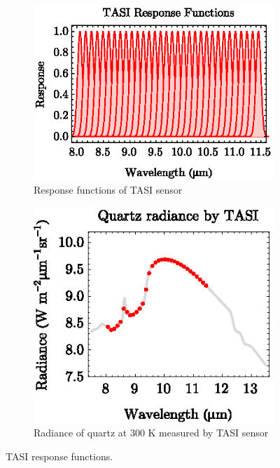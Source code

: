 \begin{figure}[thb]
	\centering
	\vspace{1em}
	\begin{subfigure}[t]{.5\linewidth}
		\centering
		\includegraphics[scale=1]{pics/Chapter_02/TASIResponseFunctions.eps}
		\caption{Response functions of TASI sensor}
		\label{fig:ResponseFunctions}
	\end{subfigure}
	\hspace{2em}
	\begin{subfigure}[t]{.4\linewidth}
		\centering
		\includegraphics[scale=1]{pics/Chapter_02/QuartzByTASI.eps}
		\caption{Radiance of quartz at 300 K measured by TASI sensor}		
		\label{fig:QuartzByTASI}
	\end{subfigure}
	\vspace{1.5 em}
	\caption{TASI response functions.}
\end{figure}

